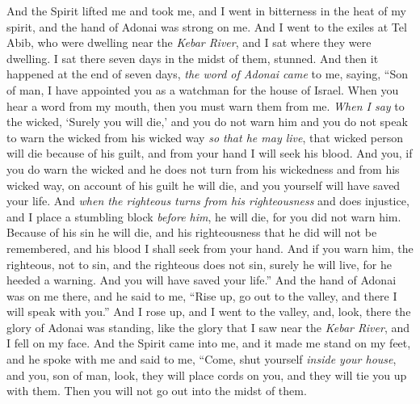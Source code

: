 \begin{biblechapter}
\verse And the Spirit lifted me and took me, and I went in bitterness in the heat of my spirit, and the hand of Adonai was strong on me.
\verse And I went to the exiles at Tel Abib, who were dwelling near the \textit{Kebar River}, and I sat where they were dwelling. I sat there seven days in the midst of them, stunned.
\verse And then it happened at the end of seven days, \textit{the word of Adonai came} to me, saying,
\verse “Son of man, I have appointed you as a watchman for the house of Israel. When you hear a word from my mouth, then you must warn them from me.
\verse \textit{When I say} to the wicked, ‘Surely you will die,’ and you do not warn him and you do not speak to warn the wicked from his wicked way \textit{so that he may live}, that wicked person will die because of his guilt, and from your hand I will seek his blood.
\verse And you, if you do warn the wicked and he does not turn from his wickedness and from his wicked way, on account of his guilt he will die, and you yourself will have saved your life.
\verse And \textit{when the righteous turns from his righteousness} and does injustice, and I place a stumbling block \textit{before him}, he will die, for you did not warn him. Because of his sin he will die, and his righteousness that he did will not be remembered, and his blood I shall seek from your hand.
\verse And if you warn him, the righteous, not to sin, and the righteous does not sin, surely he will live, for he heeded a warning. And you will have saved your life.”
\verse And the hand of Adonai was on me there, and he said to me, “Rise up, go out to the valley, and there I will speak with you.”
\verse And I rose up, and I went to the valley, and, look, there the glory of Adonai was standing, like the glory that I saw near the \textit{Kebar River}, and I fell on my face.
\verse And the Spirit came into me, and it made me stand on my feet, and he spoke with me and said to me, “Come, shut yourself \textit{inside your house},
\verse and you, son of man, look, they will place cords on you, and they will tie you up with them. Then you will not go out into the midst of them.

\end{biblechapter}

